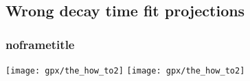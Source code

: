 \documentclass[9pt,aspectratio=43]{beamer}
\begin{document}
%
\subsection{Wrong decay time fit projections}
\begin{frame}
\frametitle{noframetitle}

\texttt{[image: gpx/the\_how\_to2]}
\texttt{[image: gpx/the\_how\_to2]}

\end{frame}
%


%
\end{document}
